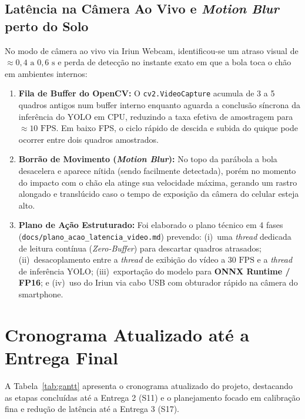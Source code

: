 \documentclass[a4paper,11pt]{article}
\begin{document}
\subsection{Latência na Câmera Ao Vivo e \textit{Motion Blur} perto do Solo}
No modo de câmera ao vivo via Iriun Webcam, identificou-se um atraso visual de $\approx 0{,}4\text{ a }0{,}6\text{ s}$ e perda de detecção no instante exato em que a bola toca o chão em ambientes internos:
\begin{enumerate}[nosep]
  \item \textbf{Fila de Buffer do OpenCV:} O \texttt{cv2.VideoCapture} acumula de 3 a 5 quadros antigos num buffer interno enquanto aguarda a conclusão síncrona da inferência do YOLO em CPU, reduzindo a taxa efetiva de amostragem para $\approx 10\text{ FPS}$. Em baixo FPS, o ciclo rápido de descida e subida do quique pode ocorrer entre dois quadros amostrados.
  \item \textbf{Borrão de Movimento (\textit{Motion Blur}):} No topo da parábola a bola desacelera e aparece nítida (sendo facilmente detectada), porém no momento do impacto com o chão ela atinge sua velocidade máxima, gerando um rastro alongado e translúcido caso o tempo de exposição da câmera do celular esteja alto.
  \item \textbf{Plano de Ação Estruturado:} Foi elaborado o plano técnico em 4 fases (\texttt{docs/plano\_acao\_latencia\_video.md}) prevendo: (i)~uma \textit{thread} dedicada de leitura contínua (\textit{Zero-Buffer}) para descartar quadros atrasados; (ii)~desacoplamento entre a \textit{thread} de exibição do vídeo a $30\text{ FPS}$ e a \textit{thread} de inferência YOLO; (iii)~exportação do modelo para \textbf{ONNX Runtime / FP16}; e (iv)~uso do Iriun via cabo USB com obturador rápido na câmera do smartphone.
\end{enumerate}

\section{Cronograma Atualizado até a Entrega Final}
A Tabela~\ref{tab:gantt} apresenta o cronograma atualizado do projeto, destacando as etapas concluídas até a Entrega 2 (S11) e o planejamento focado em calibração fina e redução de latência até a Entrega 3 (S17).
\end{document}
